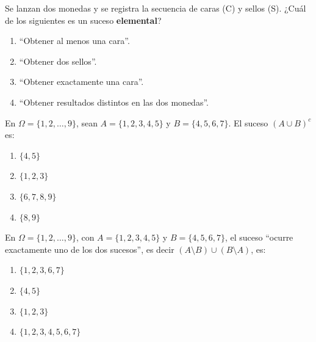 \documentclass[12pt, a4paper]{article} %
\begin{document}
\begin{enumerate}[leftmargin=*]
    \begin{minipage}{\linewidth}
    \item Se lanzan dos monedas y se registra la secuencia de caras (C) y sellos (S). ¿Cuál de los siguientes es un suceso \textbf{elemental}?
    \begin{enumerate}
        \item ``Obtener al menos una cara''.
        \item ``Obtener dos sellos''.
        \item ``Obtener exactamente una cara''.
        \item ``Obtener resultados distintos en las dos monedas''.
    \end{enumerate}
    \end{minipage}
    \vspace{0.5cm}

    \begin{minipage}{\linewidth}
    \item En $\Omega = \{1, 2, \dots, 9\}$, sean $A = \{1, 2, 3, 4, 5\}$ y $B = \{4, 5, 6, 7\}$. El suceso $(A \cup B)^c$ es:
    \begin{enumerate}
        \item $\{4, 5\}$
        \item $\{1, 2, 3\}$
        \item $\{6, 7, 8, 9\}$
        \item $\{8, 9\}$
    \end{enumerate}
    \end{minipage}
    \vspace{0.5cm}

    \begin{minipage}{\linewidth}
    \item En $\Omega = \{1, 2, \dots, 9\}$, con $A = \{1, 2, 3, 4, 5\}$ y $B = \{4, 5, 6, 7\}$, el suceso ``ocurre exactamente uno de los dos sucesos'', es decir $(A \setminus B) \cup (B \setminus A)$, es:
    \begin{enumerate}
        \item $\{1, 2, 3, 6, 7\}$
        \item $\{4, 5\}$
        \item $\{1, 2, 3\}$
        \item $\{1, 2, 3, 4, 5, 6, 7\}$
    \end{enumerate}
    \end{minipage}
    \vspace{0.5cm}


\end{enumerate}
\end{document}
